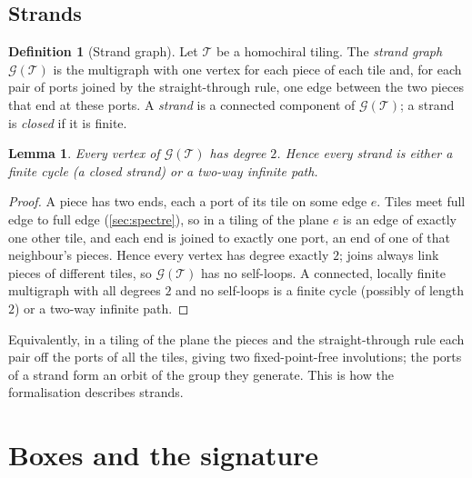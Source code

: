 \documentclass[11pt]{amsart}
\newtheorem{lemma}[theorem]{Lemma}
\theoremstyle{definition}
\newtheorem{definition}[theorem]{Definition}
\theoremstyle{remark}
\newcommand{\G}{\mathcal G}
\newcommand{\T}{\mathcal T}
\begin{document}
\subsection{Strands}\label{sec:strands}
\begin{definition}[Strand graph]\label{def:strandgraph}
Let $\T$ be a homochiral tiling. The \emph{strand graph} $\G(\T)$ is the multigraph with one vertex for each piece of
each tile and, for each pair of ports joined by the straight-through rule, one edge between the two pieces that end at
these ports. A \emph{strand} is a connected component of $\G(\T)$; a strand is \emph{closed} if it is finite.
\end{definition}

\begin{lemma}\label{lem:degree2}
Every vertex of $\G(\T)$ has degree $2$. Hence every strand is either a finite cycle (a closed strand) or a two-way
infinite path.
\end{lemma}

\begin{proof}
A piece has two ends, each a port of its tile on some edge $e$. Tiles meet full edge to full edge (\cref{sec:spectre}),
so in a tiling of the plane $e$ is an edge of exactly one other tile, and each end is joined to exactly one port, an end
of one of that neighbour's pieces. Hence every vertex has degree exactly $2$; joins always link pieces of different
tiles, so $\G(\T)$ has no self-loops. A connected, locally finite multigraph with all degrees $2$ and no self-loops is a
finite cycle (possibly of length $2$) or a two-way infinite path.
\end{proof}

Equivalently, in a tiling of the plane the pieces and the straight-through rule each pair off the ports of all the
tiles, giving two fixed-point-free involutions; the ports of a strand form an orbit of the group they generate. This
is how the formalisation describes strands.

\section{Boxes and the signature}\label{sec:boxes}
\end{document}

